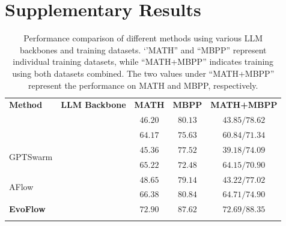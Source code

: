 \documentclass{article}
\theoremstyle{plain}
\theoremstyle{definition}
\theoremstyle{remark}
\newcommand{\ourmethod}{{\fontfamily{lmtt}\selectfont \textbf{EvoFlow}}\xspace}
\newcommand{\llmname}[1]{{\fontfamily{pcr}\selectfont {#1}}\xspace}
\begin{document}
\section{Supplementary Results}\label{app:exp-result}

\begin{table}[!h]
\centering
\caption{Performance comparison of different methods using various LLM backbones and training datasets. ‘’MATH'' and ``MBPP'' represent individual training datasets, while ``MATH+MBPP'' indicates training using both datasets combined. The two values under  ``MATH+MBPP'' represent the performance on MATH and MBPP, respectively.}
\label{tab:dylan_comparison}
\renewcommand{\arraystretch}{1.2}
\setlength{\tabcolsep}{8pt}

\begin{tabular}{l|l|ccc}
\Xhline{1.2pt}
\rowcolor{CadetBlue!20} 
\textbf{Method} & \textbf{LLM Backbone} & \textbf{MATH} & \textbf{MBPP} & \textbf{MATH+MBPP} \\ 
\Xhline{1.pt}
\multirow{2}{*}{DyLAN} & {\llmname{Deepseek-V2.5}} & $46.20$ & $80.13$ & $43.85/78.62$ \\ 
    & \llmname{QWen-2.5-72b} & $64.17$ & $75.63$ & $60.84/71.34$ \\ 
\midrule
\multirow{2}{*}{GPTSwarm} & \llmname{Deepseek-V2.5} & $45.36$ & $77.52$ & $39.18 / 74.09$   \\ 
& \llmname{QWen-2.5-72b} & $65.22$ & $72.48$ & $64.15 / 70.90$ \\ 
\midrule
\multirow{2}{*}{AFlow} & \llmname{Deepseek-V2.5} & $48.65$ & $79.14$ & $43.22 / 77.02$\\ 
 & \llmname{QWen-2.5-72b} & $66.38$ & $80.84$ & $64.71 / 74.90$ \\ 
\midrule
\ourmethod & \llmname{LLM Pool}  & $72.90$ & $87.62$ & $72.69 / 88.35$\\ 
                     
\Xhline{1.2pt}
\end{tabular}

\end{table}
\end{document}

